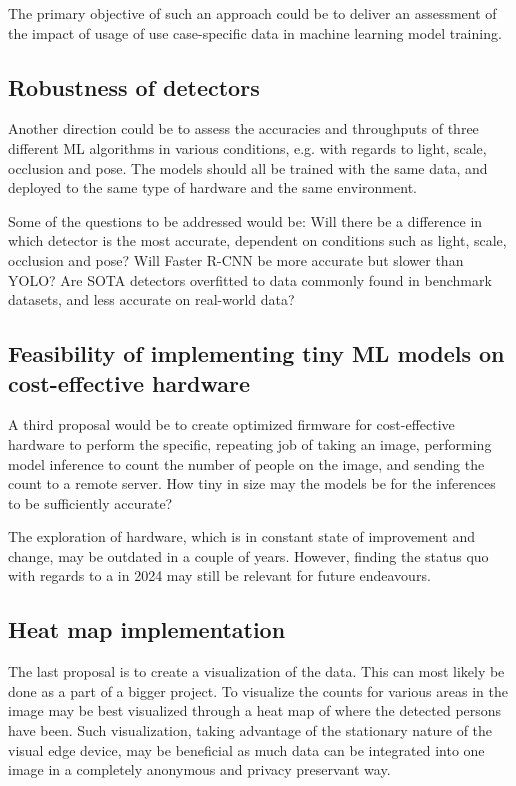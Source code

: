     The primary objective of such an approach could be to deliver an assessment of the impact of usage of use case-specific data in machine learning model training.

\subsection{Robustness of detectors}
    Another direction could be to assess the accuracies and throughputs of three different ML algorithms in various conditions, e.g. with regards to light, scale, occlusion and pose. The models should all be trained with the same data, and deployed to the same type of hardware and the same environment. 
    
    Some of the questions to be addressed would be: Will there be a difference in which detector is the most accurate, dependent on conditions such as light, scale, occlusion and pose? Will Faster R-CNN be more accurate but slower than YOLO? Are SOTA detectors overfitted to data commonly found in benchmark datasets, and less accurate on real-world data? 
    
\subsection{Feasibility of implementing tiny ML models on cost-effective hardware}
    A third proposal would be to create optimized firmware for cost-effective hardware to perform the specific, repeating job of taking an image, performing model inference to count the number of people on the image, and sending the count to a remote server. How tiny in size may the models be for the inferences to be sufficiently accurate?

    The exploration of hardware, which is in constant state of improvement and change, may be outdated in a couple of years. However, finding the status quo with regards to a in 2024 may still be relevant for future endeavours. 

\subsection{Heat map implementation}
    The last proposal is to create a visualization of the data. This can most likely be done as a part of a bigger project. To visualize the counts for various areas in the image may be best visualized through a heat map of where the detected persons have been. Such visualization, taking advantage of the stationary nature of the visual edge device, may be beneficial as much data can be integrated into one image in a completely anonymous and privacy preservant way.

    